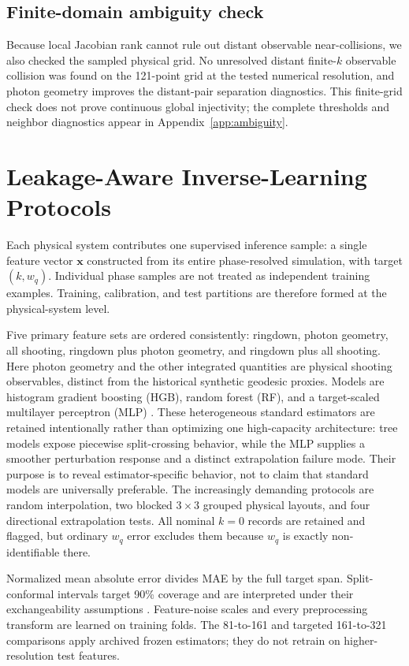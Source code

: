 \documentclass[11pt]{article}
\newcommand{\wq}{w_q}
\begin{document}
\subsection{Finite-domain ambiguity check}
Because local Jacobian rank cannot rule out distant observable near-collisions,
we also checked the sampled physical grid. No unresolved distant finite-$k$
observable collision was found on the 121-point grid at the tested numerical
resolution, and photon geometry improves the distant-pair separation
diagnostics. This finite-grid check does not prove continuous global
injectivity; the complete thresholds and neighbor diagnostics appear in
Appendix~\ref{app:ambiguity}.

\section{Leakage-Aware Inverse-Learning Protocols}
Each physical system contributes one supervised inference sample: a single
feature vector $\mathbf{x}$ constructed from its entire phase-resolved
simulation, with target $(k,\wq)$. Individual phase samples are not treated as
independent training examples. Training, calibration, and test partitions are
therefore formed at the physical-system level.

Five primary feature sets are ordered consistently: ringdown, photon geometry,
all shooting, ringdown plus photon geometry, and ringdown plus all shooting.
Here photon geometry and the other integrated quantities are physical shooting
observables, distinct from the historical synthetic geodesic proxies.
Models are histogram gradient boosting (HGB), random forest (RF), and a
target-scaled multilayer perceptron (MLP) \cite{breiman2001random,friedman2001greedy,pedregosa2011scikit}.
These heterogeneous standard estimators are retained intentionally rather than
optimizing one high-capacity architecture: tree models expose piecewise
split-crossing behavior, while the MLP supplies a smoother perturbation
response and a distinct extrapolation failure mode. Their purpose is to reveal
estimator-specific behavior, not to claim that standard models are universally
preferable.
The increasingly demanding protocols are random interpolation, two blocked
$3\times3$ grouped physical layouts, and four directional extrapolation tests.
All nominal $k=0$ records
are retained and flagged, but ordinary $\wq$ error excludes them because $\wq$
is exactly non-identifiable there.

Normalized mean absolute error divides MAE by the full target span.
Split-conformal intervals target 90\% coverage and are interpreted under their
exchangeability assumptions \cite{vovk2005conformal,tibshirani2019covariate,angelopoulos2021guide}.
Feature-noise scales and every preprocessing transform are learned on training
folds. The 81-to-161 and targeted 161-to-321 comparisons apply archived frozen
estimators; they do not retrain on higher-resolution test features.
\end{document}
